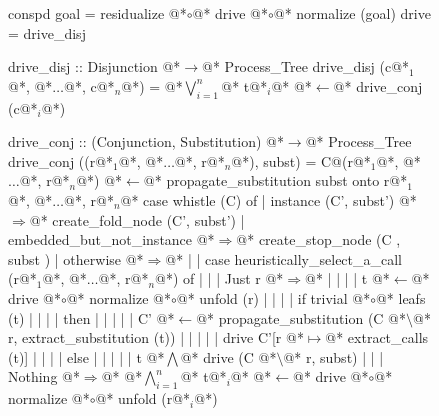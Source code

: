\documentclass[12pt,a4paper]{report}
\begin{document}
\thispagestyle{empty}
\begin{figure}[h]
\begin{PseudoCode}[moredelim={[is][stringstyle]{@@}{@@}},
  moredelim={[is][\color{dkgreen}\bfseries]{@!}{@!}},
  moredelim={[is][\color{red}\bfseries]{!!}{!!}}]
conspd goal = residualize @*$\circ$@* drive @*$\circ$@* normalize (goal)
drive       = drive_disj

drive_disj :: Disjunction @*$\to$@* Process_Tree
drive_disj (c@*$_1$@*, @*$\dots$@*, c@*$_n$@*) = @*$\bigvee_{i=1}^n$@* t@*$_i$@* @*$\leftarrow$@* drive_conj (c@*$_i$@*)

drive_conj :: (Conjunction, Substitution) @*$\to$@* Process_Tree
drive_conj ((r@*$_1$@*, @*$\dots$@*, r@*$_n$@*), subst) =
  C@(r@*$_1$@*, @*$\dots$@*, r@*$_n$@*) @*$\leftarrow$@* propagate_substitution subst onto r@*$_1$@*, @*$\dots$@*, r@*$_n$@*
  case whistle (C) of
  | instance (C', subst')     @*$\Rightarrow$@* create_fold_node (C', subst')
  | embedded_but_not_instance @*$\Rightarrow$@* create_stop_node (C , subst )
  | otherwise @*$\Rightarrow$@*
  | | case heuristically_select_a_call (r@*$_1$@*, @*$\dots$@*, r@*$_n$@*) of
  | | | Just r @*$\Rightarrow$@*
  | | | | t @*$\leftarrow$@* drive @*$\circ$@* normalize @*$\circ$@* unfold (r)
  | | | | if trivial @*$\circ$@* leafs (t)
  | | | | then
  | | | | | C' @*$\leftarrow$@* propagate_substitution (C @*$\setminus$@* r, extract_substitution (t))
  | | | | | drive C'[r @*$\mapsto$@* extract_calls (t)]
  | | | | else
  | | | | | t @*$\bigwedge$@* drive (C @*$\setminus$@* r, subst)
  | | | Nothing @*$\Rightarrow$@* @*$\bigwedge_{i=1}^n$@* t@*$_i$@* @*$\leftarrow$@* drive @*$\circ$@* normalize @*$\circ$@* unfold (r@*$_i$@*)
\end{PseudoCode}
\end{figure}
\end{document}
